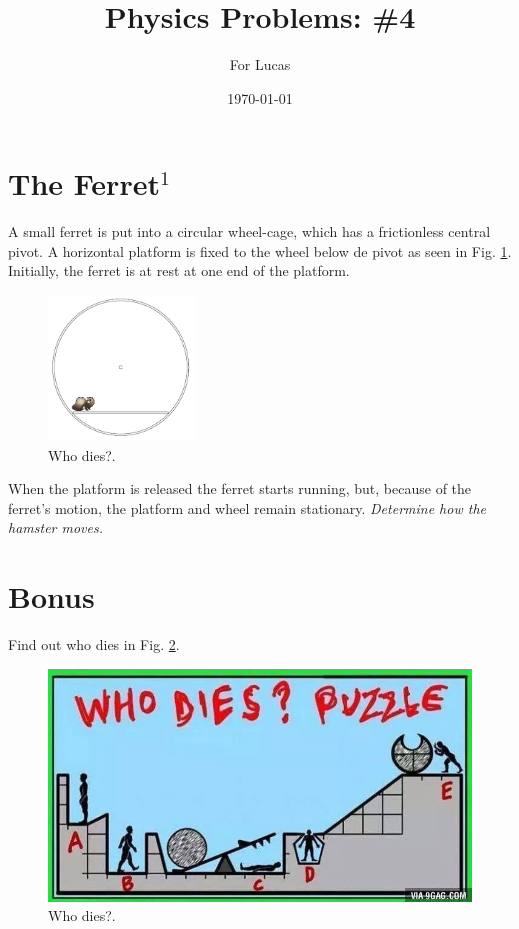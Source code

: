\documentclass{article}
\begin{document}
\title{Physics Problems: \#4}

\author{For Lucas}

\date{\today}
\maketitle


\section*{The Ferret$^1$}

A small ferret is put into a circular wheel-cage, which has a frictionless central pivot. A horizontal platform is fixed to the wheel below de pivot as seen in Fig. \ref{fig:ferret}. Initially, the ferret is at rest at one end of the platform. \\

\begin{figure}[h!]
\begin{center}
\includegraphics[width=0.35\textwidth]{ferret}
\end{center}
\caption{Who dies?.}
\label{fig:ferret}
\end{figure}

When the platform is released the ferret starts running, but, because of the ferret's motion, the platform and wheel remain stationary. \textit{Determine how the hamster moves.}

\section*{Bonus}

Find out who dies in Fig. \ref{fig:whodies}.\\

\begin{figure}[h!]
\begin{center}
\includegraphics[width=1\textwidth]{whodies}
\end{center}
\caption{Who dies?.}
\label{fig:whodies}
\end{figure}
\end{document}
